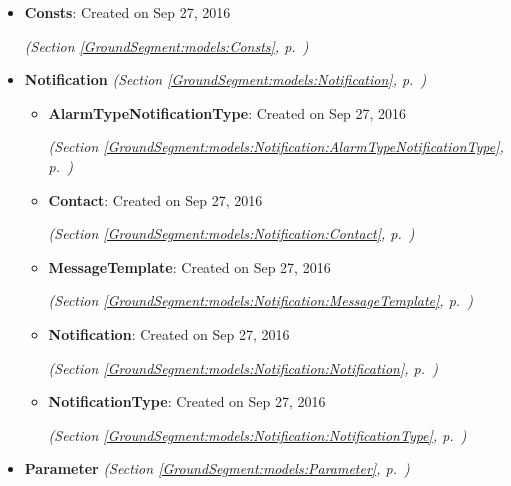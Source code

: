 \begin{itemize}
\item \textbf{Consts}: Created on Sep 27, 2016



  \textit{(Section \ref{GroundSegment:models:Consts}, p.~\pageref{GroundSegment:models:Consts})}

\item \textbf{Notification}
  \textit{(Section \ref{GroundSegment:models:Notification}, p.~\pageref{GroundSegment:models:Notification})}

  \begin{itemize}
\setlength{\parskip}{0ex}
    \item \textbf{AlarmTypeNotificationType}: Created on Sep 27, 2016



  \textit{(Section \ref{GroundSegment:models:Notification:AlarmTypeNotificationType}, p.~\pageref{GroundSegment:models:Notification:AlarmTypeNotificationType})}

    \item \textbf{Contact}: Created on Sep 27, 2016



  \textit{(Section \ref{GroundSegment:models:Notification:Contact}, p.~\pageref{GroundSegment:models:Notification:Contact})}

    \item \textbf{MessageTemplate}: Created on Sep 27, 2016



  \textit{(Section \ref{GroundSegment:models:Notification:MessageTemplate}, p.~\pageref{GroundSegment:models:Notification:MessageTemplate})}

    \item \textbf{Notification}: Created on Sep 27, 2016



  \textit{(Section \ref{GroundSegment:models:Notification:Notification}, p.~\pageref{GroundSegment:models:Notification:Notification})}

    \item \textbf{NotificationType}: Created on Sep 27, 2016



  \textit{(Section \ref{GroundSegment:models:Notification:NotificationType}, p.~\pageref{GroundSegment:models:Notification:NotificationType})}

  \end{itemize}
\item \textbf{Parameter}
  \textit{(Section \ref{GroundSegment:models:Parameter}, p.~\pageref{GroundSegment:models:Parameter})}


\end{itemize}
